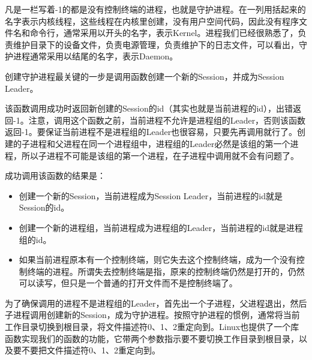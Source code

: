 

凡是一栏写着-1的都是没有控制终端的进程，也就是守护进程。在一列用\BookCode{[\BookSplit{}]\BookSplit{}}括起来的名字表示内核线程，这些线程在内核里创建，没有用户空间代码，因此没有程序文件名和命令行，通常采用以开头的名字，表示Kernel。进程我们已经很熟悉了，负责维护目录下的设备文件，负责电源管理，负责维护下的日志文件，可以看出，守护进程通常采用以结尾的名字，表示Daemon。



创建守护进程最关键的一步是调用函数创建一个新的Session，并成为Session Leader。




该函数调用成功时返回新创建的Session的id（其实也就是当前进程的id），出错返回-1。注意，调用这个函数之前，当前进程不允许是进程组的Leader，否则该函数返回-1。要保证当前进程不是进程组的Leader也很容易，只要先再调用就行了。创建的子进程和父进程在同一个进程组中，进程组的Leader必然是该组的第一个进程，所以子进程不可能是该组的第一个进程，在子进程中调用就不会有问题了。



成功调用该函数的结果是：


\begin{itemize}

\item 创建一个新的Session，当前进程成为Session Leader，当前进程的id就是Session的id。

\item 创建一个新的进程组，当前进程成为进程组的Leader，当前进程的id就是进程组的id。

\item 如果当前进程原本有一个控制终端，则它失去这个控制终端，成为一个没有控制终端的进程。所谓失去控制终端是指，原来的控制终端仍然是打开的，仍然可以读写，但只是一个普通的打开文件而不是控制终端了。
\end{itemize}




为了确保调用的进程不是进程组的Leader，首先出一个子进程，父进程退出，然后子进程调用创建新的Session，成为守护进程。按照守护进程的惯例，通常将当前工作目录切换到根目录，将文件描述符0、1、2重定向到。Linux也提供了一个库函数实现我们的函数的功能，它带两个参数指示要不要切换工作目录到根目录，以及要不要把文件描述符0、1、2重定向到。


